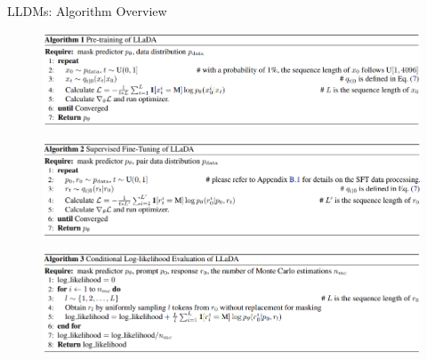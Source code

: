 \begin{frame}[allowframebreaks]{LLDMs: Algorithm Overview}
    \begin{figure}
        \centering
        \includegraphics[height=0.9\textheight,width=1.05\textwidth,keepaspectratio]{images/recent-advance/lldm-pretraining.png}
    \end{figure}
\framebreak
    \begin{figure}
        \centering
        \includegraphics[height=0.9\textheight,width=1.05\textwidth,keepaspectratio]{images/recent-advance/lldm-supervised-finetuning.png}
    \end{figure}
\framebreak
    \begin{figure}
        \centering
        \includegraphics[height=0.9\textheight,width=1.05\textwidth,keepaspectratio]{images/recent-advance/lldm-log-likelihood.png}
    \end{figure}
\end{frame}